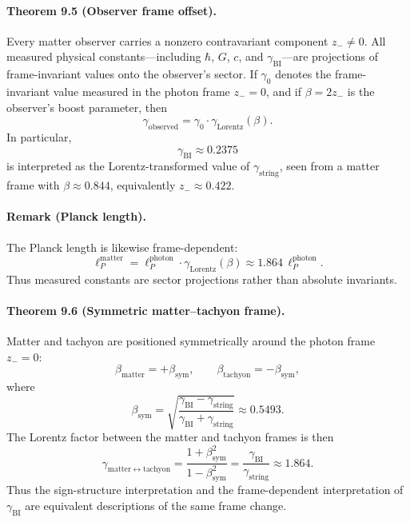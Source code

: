 \paragraph*{Theorem 9.5 (Observer frame offset).}
Every matter observer carries a nonzero contravariant component $z_- \neq 0$. All measured physical constants---including $\hbar$, $G$, $c$, and $\gamma_{\mathrm{BI}}$---are projections of frame-invariant values onto the observer's sector. If $\gamma_0$ denotes the frame-invariant value measured in the photon frame $z_-=0$, and if $\beta=2z_-$ is the observer's boost parameter, then
\[
\gamma_{\mathrm{observed}} = \gamma_0 \cdot \gamma_{\mathrm{Lorentz}}(\beta).
\]
In particular,
\[
\gamma_{\mathrm{BI}} \approx 0.2375
\]
is interpreted as the Lorentz-transformed value of $\gamma_{\mathrm{string}}$, seen from a matter frame with $\beta \approx 0.844$, equivalently $z_- \approx 0.422$.

\paragraph*{Remark (Planck length).}
The Planck length is likewise frame-dependent:
\[
\ell_P^{\mathrm{matter}} = \ell_P^{\mathrm{photon}} \cdot \gamma_{\mathrm{Lorentz}}(\beta) \approx 1.864\, \ell_P^{\mathrm{photon}}.
\]
Thus measured constants are sector projections rather than absolute invariants.

\paragraph*{Theorem 9.6 (Symmetric matter--tachyon frame).}
Matter and tachyon are positioned symmetrically around the photon frame $z_-=0$:
\[
\beta_{\mathrm{matter}} = +\beta_{\mathrm{sym}}, \qquad \beta_{\mathrm{tachyon}} = -\beta_{\mathrm{sym}},
\]
where
\[
\beta_{\mathrm{sym}} = \sqrt{\frac{\gamma_{\mathrm{BI}}-\gamma_{\mathrm{string}}}{\gamma_{\mathrm{BI}}+\gamma_{\mathrm{string}}}} \approx 0.5493.
\]
The Lorentz factor between the matter and tachyon frames is then
\[
\gamma_{\mathrm{matter}\leftrightarrow\mathrm{tachyon}} = \frac{1+\beta_{\mathrm{sym}}^2}{1-\beta_{\mathrm{sym}}^2} = \frac{\gamma_{\mathrm{BI}}}{\gamma_{\mathrm{string}}} \approx 1.864.
\]
Thus the sign-structure interpretation and the frame-dependent interpretation of $\gamma_{\mathrm{BI}}$ are equivalent descriptions of the same frame change.


